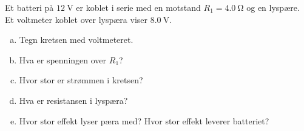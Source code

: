%
Et batteri på $\SI{12}{\volt}$ er koblet i serie med en motstand $R_1 = \SI{4.0}{\ohm}$ og en lyspære. Et voltmeter koblet over lyspæra viser $\SI{8.0}{\volt}$.
\begin{enumerate}[a)]
    \item Tegn kretsen med voltmeteret.
    \item Hva er spenningen over $R_1$?
    \item Hvor stor er strømmen i kretsen?
    \item Hva er resistansen i lyspæra?
    \item Hvor stor effekt lyser pæra med? Hvor stor effekt leverer batteriet?
\end{enumerate}
%
